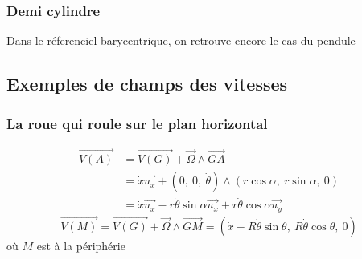 \documentclass[../main.tex]{subfile}
\begin{document}
\subsubsection{Demi cylindre}
Dans le réferenciel barycentrique, on retrouve encore le cas du pendule


\subsection{Exemples de champs des vitesses}
\subsubsection{La roue qui roule sur le plan horizontal}

$$
\begin{aligned}
	\vec{V(A)} &= \vec{V(G)} + \vec{\Omega} \wedge \vec{GA}\\
	&= \dot{x}\vec{u_x} + \left( 0 ,\ 0 ,\ \dot{\theta}\right) \wedge \left( r \cos\alpha ,\ r \sin\alpha ,\ 0\right)\\
	&= \dot{x}\vec{u_x} - r \dot{\theta} \sin\alpha \vec{u_x} + r \dot{\theta} \cos\alpha \vec{u_y}
\end{aligned}
$$
$$\vec{V(M)} = \vec{V(G)} + \vec{\Omega} \wedge \vec{GM} = \left( \dot{x} - R \dot{\theta} \sin\theta ,\ R\dot{\theta} \cos\theta ,\ 0\right)$$
où $M$  est à la périphérie
\end{document}
